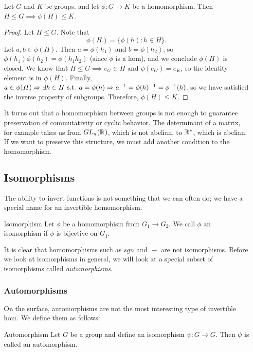 \begin{theorem}{}
    Let $G$ and $K$ be groups, and let $\phi: G\to K$ be a homomorphism. Then $H\leq G\implies \phi(H)\leq K$.
\end{theorem}
\begin{proof}
    Let $H\leq G$. Note that
    \[
        \phi(H) = \{\phi(h) : h\in H\}.
    \]
    Let $a,b\in\phi(H)$.
    Then $a=\phi(h_{1})$ and $b=\phi(h_{2})$, so $\phi(h_{1})\phi(h_{2})=\phi(h_{1}h_{2})$ (since $\phi$ is a hom), and we conclude $\phi(H)$ is closed.
    We know that $H\leq G\implies e_{G}\in H$ and $\phi(e_{G})=e_{K}$, so the identity element is in $\phi(H)$.
    Finally, $a\in \phi(H)\Rightarrow \exists h\in H\text{ s.t. } a=\phi(h)\Rightarrow a^{-1}=\phi(h)^{-1}=\phi^{-1}(h)$, so we have satisfied the inverse property of subgroups.
    Therefore, $\phi(H)\leq K$.
\end{proof}

It turns out that a homomorphism between groups is not enough to guarantee preservation of commutativity or cyclic behavior.
The determinant of a matrix, for example takes us from $GL_{n}(\mathbb{R})$, which is not abelian, to $\mathbb{R}^{*}$, which is abelian.
If we want to preserve this structure, we must add another condition to the homomorphism.

\subsection*{Isomorphisms}
The ability to invert functions is not something that we can often do; we have a special name for an invertible homomorphism.
\begin{definition}{Isomorphism}
    Let $\phi$ be a homomorphism from $G_{1}\to G_{2}$. We call $\phi$ an isomorphism if $\phi$ is bijective on $G_{1}$.
\end{definition}

It is clear that homomorphisms such as $sgn$ and $\equiv$ are not isomorphisms.
Before we look at isomorphisms in general, we will look at a special subset of isomorphisms called \textit{automorphisms}.

\subsubsection{Automorphisms}
On the surface, automorphisms are not the most interesting type of invertible hom.
We define them as follows:

\begin{definition}{Automorphism}
    Let $G$ be a group and define an isomorphism $\psi: G\to G$. Then $\psi$ is called an automorphism.
\end{definition}

